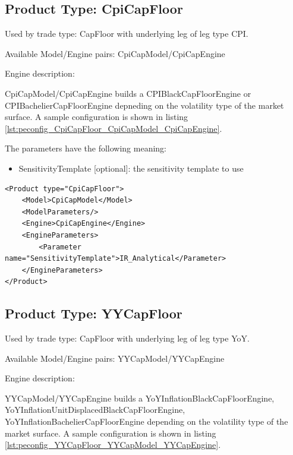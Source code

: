 \subsection{Product Type: CpiCapFloor}

Used by trade type: CapFloor with underlying leg of leg type CPI.

Available Model/Engine pairs: CpiCapModel/CpiCapEngine

Engine description:

CpiCapModel/CpiCapEngine builds a CPIBlackCapFloorEngine or CPIBachelierCapFloorEngine depneding on the volatility type
of the market surface. A sample configuration is shown in listing
\ref{lst:peconfig_CpiCapFloor_CpiCapModel_CpiCapEngine}.

The parameters have the following meaning:

\begin{itemize}
\item SensitivityTemplate [optional]: the sensitivity template to use
\end{itemize}

\begin{longlisting}
\begin{verbatim}
<Product type="CpiCapFloor">
    <Model>CpiCapModel</Model>
    <ModelParameters/>
    <Engine>CpiCapEngine</Engine>
    <EngineParameters>
        <Parameter name="SensitivityTemplate">IR_Analytical</Parameter>
    </EngineParameters>
</Product>
\end{verbatim}
\caption{Configuration for Product CpiCapFloor, Model CpiCapModel, Engine CpiCapEngine}
\label{lst:peconfig_CpiCapFloor_CpiCapModel_CpiCapEngine}
\end{longlisting}

\subsection{Product Type: YYCapFloor}

Used by trade type: CapFloor with underlying leg of leg type YoY.

Available Model/Engine pairs: YYCapModel/YYCapEngine

Engine description:

YYCapModel/YYCapEngine builds a YoYInflationBlackCapFloorEngine, YoYInflationUnitDisplacedBlackCapFloorEngine,
YoYInflationBachelierCapFloorEngine depending on the volatility type of the market surface. A sample configuration is
shown in listing \ref{lst:peconfig_YYCapFloor_YYCapModel_YYCapEngine}.

